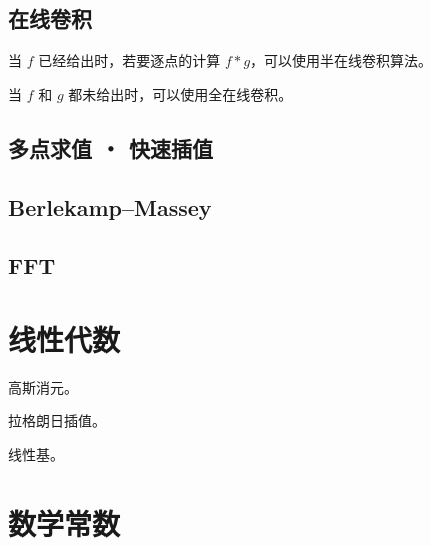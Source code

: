 \documentclass{probook}
\begin{document}
\begin{multicols}{2}


\subsection{在线卷积}

当 $f$ 已经给出时，若要逐点的计算 $f \ast g$，可以使用半在线卷积算法。



当 $f$ 和 $g$ 都未给出时，可以使用全在线卷积。



\subsection{多点求值 ・ 快速插值}



\subsection{Berlekamp–Massey}



\subsection{FFT}



\section{线性代数}

高斯消元。



拉格朗日插值。



线性基。





\section{数学常数}


\end{multicols}
\end{document}
